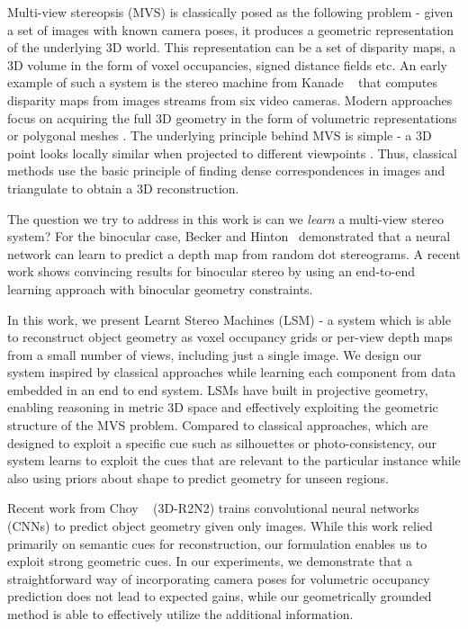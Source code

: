 \documentclass[../thesis.tex]{subfiles}
\begin{document}
Multi-view stereopsis (MVS) is classically posed as the following problem - given a set of images with known camera poses, it produces a geometric representation of the underlying 3D world. This representation can be a set of disparity maps, a 3D volume in the form of voxel occupancies, signed distance fields etc. An early example of such a system is the stereo machine from Kanade \etal ~\cite{kanade1995development} that computes disparity maps from images streams from six video cameras. Modern approaches focus on acquiring the full 3D geometry in the form of volumetric representations or polygonal meshes \cite{seitz2006comparison}. The underlying principle behind MVS is simple - a 3D point looks locally similar when projected to different viewpoints \cite{kutulakos2000theory}. Thus, classical methods use the basic principle of finding dense correspondences in images and triangulate to obtain a 3D reconstruction.

The question we try to address in this work is can we \textit{learn} a multi-view stereo system? For the binocular case, Becker and Hinton~\cite{becker1992self} demonstrated that a neural network can learn to predict a depth map from random dot stereograms. A recent work \cite{kendall2017end} shows convincing results for binocular stereo by using an end-to-end learning approach with binocular geometry constraints.

In this work, we present Learnt Stereo Machines (LSM) - a system which is able to reconstruct object geometry as voxel occupancy grids or per-view depth maps from a small number of views, including just a single image. We design our system inspired by classical approaches while learning each component from data embedded in an end to end system. LSMs have built in projective geometry, enabling reasoning in metric 3D space and effectively exploiting the geometric structure of the MVS problem. Compared to classical approaches, which are designed to exploit a specific cue such as silhouettes or photo-consistency, our system learns to exploit the cues that are relevant to the particular instance while also using priors about shape to predict geometry for unseen regions.

Recent work from Choy \etal~\cite{choy20163d} (3D-R2N2) trains convolutional neural networks (CNNs) to predict object geometry given only images. While this work relied primarily on semantic cues for reconstruction, our formulation enables us to exploit strong geometric cues. In our experiments, we demonstrate that a straightforward way of incorporating camera poses for volumetric occupancy prediction does not lead to expected gains, while our geometrically grounded method is able to effectively utilize the additional information.
\end{document}
